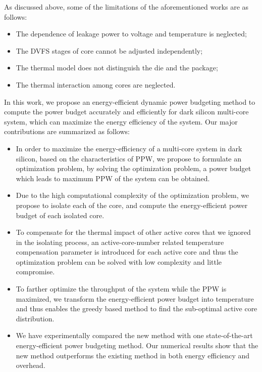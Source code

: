 As discussed above, some of the limitations of the aforementioned works are as follows:
\begin{itemize}  
\item The dependence of leakage power to voltage and temperature is neglected;
\item The DVFS stages of core cannot be adjusted independently;
\item The thermal model does not distinguish the die and the package;
\item The thermal interaction among cores are neglected.
\end{itemize} 

In this work, we propose an energy-efficient dynamic power budgeting method to compute the power budget accurately and efficiently for dark silicon multi-core system, which can maximize the energy efficiency of the system. Our major contributions are summarized as follows:
\begin{itemize}
\item In order to maximize the energy-efficiency of a multi-core system in dark silicon, based on the characteristics of PPW, we propose to formulate an optimization problem, by solving the optimization problem, a power budget which leads to maximum PPW of the system can be obtained.
\item Due to the high computational complexity of the optimization problem, we propose to isolate each of the core, and compute the energy-efficient power budget of each isolated core.
\item To compensate for the thermal impact of other active cores that we ignored in the isolating process, an active-core-number related temperature compensation parameter is introduced for each active core and thus the optimization problem can be solved with low complexity and little compromise.
\item To farther optimize the throughput of the system while the PPW is maximized, we transform the energy-efficient power budget into temperature and thus enables the greedy based method to find the sub-optimal active core distribution.
\item We have experimentally compared the new method with one state-of-the-art energy-efficient power budgeting method. Our numerical results show that the new method outperforms the existing method in both energy efficiency and overhead.
\end{itemize} 